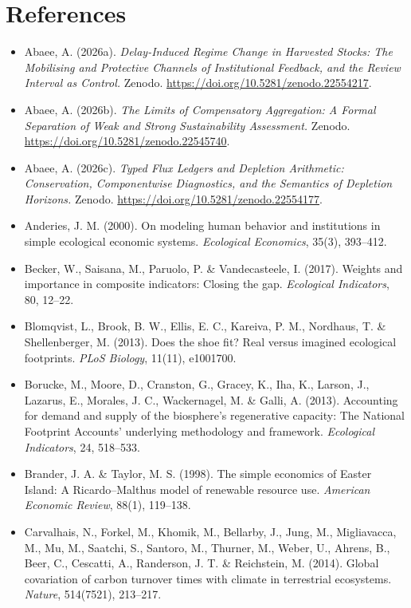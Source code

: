 \documentclass[11pt]{article}
\begin{document}
\section{References}

\begin{itemize}
\item Abaee, A. (2026a). \emph{Delay-Induced Regime Change in Harvested Stocks: The Mobilising and Protective Channels of Institutional Feedback, and the Review Interval as Control.} Zenodo. \url{https://doi.org/10.5281/zenodo.22554217}.
\item Abaee, A. (2026b). \emph{The Limits of Compensatory Aggregation: A Formal Separation of Weak and Strong Sustainability Assessment.} Zenodo. \url{https://doi.org/10.5281/zenodo.22545740}.
\item Abaee, A. (2026c). \emph{Typed Flux Ledgers and Depletion Arithmetic: Conservation, Componentwise Diagnostics, and the Semantics of Depletion Horizons.} Zenodo. \url{https://doi.org/10.5281/zenodo.22554177}.
\item Anderies, J. M. (2000). On modeling human behavior and institutions in simple ecological economic systems. \emph{Ecological Economics}, 35(3), 393--412.
\item Becker, W., Saisana, M., Paruolo, P. \& Vandecasteele, I. (2017). Weights and importance in composite indicators: Closing the gap. \emph{Ecological Indicators}, 80, 12--22.
\item Blomqvist, L., Brook, B. W., Ellis, E. C., Kareiva, P. M., Nordhaus, T. \& Shellenberger, M. (2013). Does the shoe fit? Real versus imagined ecological footprints. \emph{PLoS Biology}, 11(11), e1001700.
\item Borucke, M., Moore, D., Cranston, G., Gracey, K., Iha, K., Larson, J., Lazarus, E., Morales, J. C., Wackernagel, M. \& Galli, A. (2013). Accounting for demand and supply of the biosphere's regenerative capacity: The National Footprint Accounts' underlying methodology and framework. \emph{Ecological Indicators}, 24, 518--533.
\item Brander, J. A. \& Taylor, M. S. (1998). The simple economics of Easter Island: A Ricardo--Malthus model of renewable resource use. \emph{American Economic Review}, 88(1), 119--138.
\item Carvalhais, N., Forkel, M., Khomik, M., Bellarby, J., Jung, M., Migliavacca, M., Mu, M., Saatchi, S., Santoro, M., Thurner, M., Weber, U., Ahrens, B., Beer, C., Cescatti, A., Randerson, J. T. \& Reichstein, M. (2014). Global covariation of carbon turnover times with climate in terrestrial ecosystems. \emph{Nature}, 514(7521), 213--217.

\end{itemize}
\end{document}
